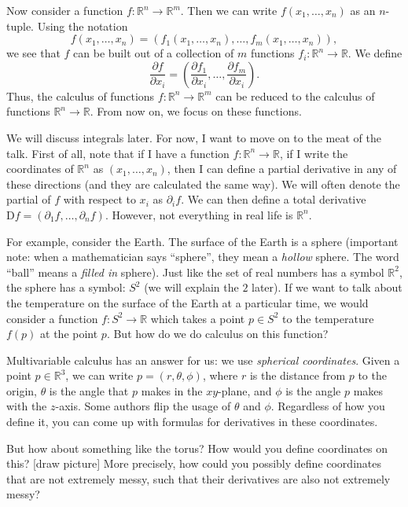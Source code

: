 Now consider a function $f : \mathbb{R} ^n \to \mathbb{R} ^m$. Then we can write $f(x_1, \ldots , x_n)$ as an $n$-tuple. Using the notation
\[
	f(x_1, \ldots , x_n) = (f_1(x_1, \ldots , x_n), \ldots , f_m(x_1, \ldots , x_n)),
\]
we see that $f$ can be built out of a collection of $m$ functions $f_i : \mathbb{R} ^n \to \mathbb{R} $. We define
\[
	\frac{\partial f}{\partial x_i} =\left( \frac{\partial f_1}{\partial x_i} , \ldots , \frac{\partial f_m}{\partial x_i}  \right) 
.\]
Thus, the calculus of functions $f : \mathbb{R} ^n \to \mathbb{R} ^m$ can be reduced to the calculus of functions $\mathbb{R} ^n\to \mathbb{R} $. From now on, we focus on these functions.

We will discuss integrals later. For now, I want to move on to the meat of the talk. First of all, note that if I have a function $f : \mathbb{R} ^n \to \mathbb{R} $, if I write the coordinates of $\mathbb{R} ^n$ as $(x_1, \ldots , x_n)$, then I can define a partial derivative in any of these directions (and they are calculated the same way). We will often denote the partial of $f$ with respect to $x_i$ as $\partial _if$. We can then define a total derivative $\mathrm{D} f = (\partial _1f, \ldots , \partial _nf)$. However, not everything in real life is $\mathbb{R} ^n$.

For example, consider the Earth. The surface of the Earth is a sphere (important note: when a mathematician says ``sphere'', they mean a \emph{hollow} sphere. The word ``ball'' means a \emph{filled in} sphere). Just like the set of real numbers has a symbol $\mathbb{R} ^2$, the sphere has a symbol: $S^2$ (we will explain the $2$ later). If we want to talk about the temperature on the surface of the Earth at a particular time, we would consider a function $f : S^2 \to \mathbb{R} $ which takes a point $p\in S^2$ to the temperature $f(p)$ at the point $p$. But how do we do calculus on this function?

Multivariable calculus has an answer for us: we use \emph{spherical coordinates}. Given a point $p\in\mathbb{R} ^3$, we can write $p=(r,\theta ,\phi )$, where $r$ is the distance from $p$ to the origin, $\theta $ is the angle that $p$ makes in the $xy$-plane, and $\phi $ is the angle $p$ makes with the $z$-axis. Some authors flip the usage of $\theta $ and $\phi $. Regardless of how you define it, you can come up with formulas for derivatives in these coordinates.

But how about something like the torus? How would you define coordinates on this? [draw picture] More precisely, how could you possibly define coordinates that are not extremely messy, such that their derivatives are also not extremely messy?

